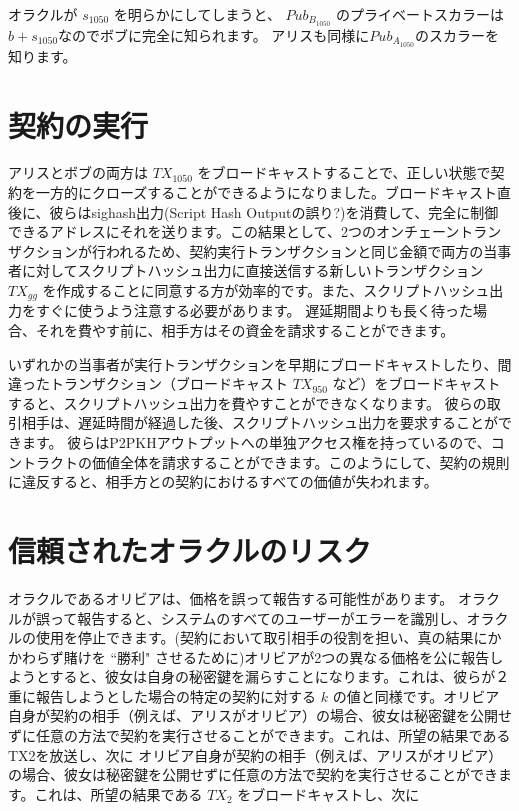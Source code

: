 \documentclass[11pt]{article}
\begin{document}
オラクルが \(s_{1050}\) を明らかにしてしまうと、 \(Pub_{B_{1050}}\) のプライベートスカラーは \(b + s_{1050}\)なのでボブに完全に知られます。 アリスも同様に\(Pub_{A_{1050}}\)のスカラーを知ります。

\section*{契約の実行}

アリスとボブの両方は \(TX_{1050}\) をブロードキャストすることで、正しい状態で契約を一方的にクローズすることができるようになりました。ブロードキャスト直後に、彼らはsighash出力(Script Hash Outputの誤り?)を消費して、完全に制御できるアドレスにそれを送ります。この結果として、2つのオンチェーントランザクションが行われるため、契約実行トランザクションと同じ金額で両方の当事者に対してスクリプトハッシュ出力に直接送信する新しいトランザクション \(TX_{gg}\) を作成することに同意する方が効率的です。また、スクリプトハッシュ出力をすぐに使うよう注意する必要があります。 遅延期間よりも長く待った場合、それを費やす前に、相手方はその資金を請求することができます。

いずれかの当事者が実行トランザクションを早期にブロードキャストしたり、間違ったトランザクション（ブロードキャスト \(TX_{950}\) など）をブロードキャストすると、スクリプトハッシュ出力を費やすことができなくなります。 彼らの取引相手は、遅延時間が経過した後、スクリプトハッシュ出力を要求することができます。 彼らはP2PKHアウトプットへの単独アクセス権を持っているので、コントラクトの価値全体を請求することができます。このようにして、契約の規則に違反すると、相手方との契約におけるすべての価値が失われます。

\section*{信頼されたオラクルのリスク}

オラクルであるオリビアは、価格を誤って報告する可能性があります。 オラクルが誤って報告すると、システムのすべてのユーザーがエラーを識別し、オラクルの使用を停止できます。(契約において取引相手の役割を担い、真の結果にかかわらず賭けを ``勝利" させるために)オリビアが2つの異なる価格を公に報告しようとすると、彼女は自身の秘密鍵を漏らすことになります。これは、彼らが２重に報告しようとした場合の特定の契約に対する \(k\) の値と同様です。オリビア自身が契約の相手（例えば、アリスがオリビア）の場合、彼女は秘密鍵を公開せずに任意の方法で契約を実行させることができます。これは、所望の結果であるTX2を放送し、次に
オリビア自身が契約の相手（例えば、アリスがオリビア）の場合、彼女は秘密鍵を公開せずに任意の方法で契約を実行させることができます。これは、所望の結果である \(TX_{2}\) をブロードキャストし、次に
\end{document}
